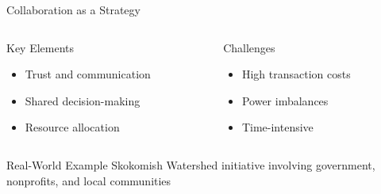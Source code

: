 \documentclass[10pt]{beamer}
\begin{document}
\begin{frame}{Collaboration as a Strategy}
    \begin{columns}[T]
        \begin{column}{0.5\textwidth}
            \begin{block}{Key Elements}
                \begin{itemize}
                    \item Trust and communication
                    \item Shared decision-making
                    \item Resource allocation
                \end{itemize}
            \end{block}
        \end{column}
        \begin{column}{0.5\textwidth}
            \begin{alertblock}{Challenges}
                \begin{itemize}
                    \item High transaction costs
                    \item Power imbalances
                    \item Time-intensive
                \end{itemize}
            \end{alertblock}
        \end{column}
    \end{columns}
    
    \begin{exampleblock}{Real-World Example}
        Skokomish Watershed initiative involving government, nonprofits, and local communities
    \end{exampleblock}
\end{frame}
\end{document}
